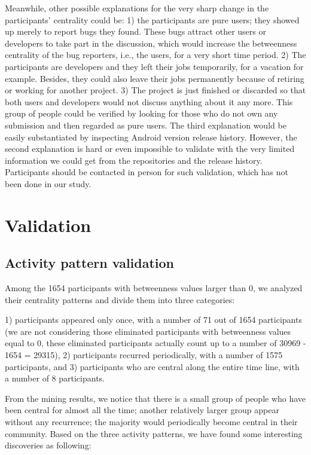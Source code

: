 \documentclass[10pt, conference, compsocconf]{IEEEtran}
\begin{document}
Meanwhile, other possible explanations for the very sharp change in
the participants' centrality could be: 1) the participants are pure
users; they showed up merely to report bugs they found. These bugs
attract other users or developers to take part in the discussion,
which would increase the betweenness centrality of the bug reporters,
i.e., the users, for a very short time period. 2) The participants are
developers and they left their jobs temporarily, for a vacation for
example. Besides, they could also leave their jobs permanently because
of retiring or working for another project. 3) The project is just
finished or discarded so that both users and developers would not
discuss anything about it any more. This group of people could be
verified by looking for those who do not own any submission and then
regarded as pure users. The third explanation would be easily
substantiated by inspecting Android version release history. However,
the second explanation is hard or even impossible to validate with the
very limited information we could get from the repositories and the
release history. Participants should be contacted in person for such
validation, which has not been done in our study.




\section{Validation}
\label{validation}
\subsection{Activity pattern validation}

Among the 1654 participants with betweenness values larger than 0, we
analyzed their centrality patterns and divide them into three
categories: 

1) participants appeared only once, with a number of 71 out of 1654
participants (we are not considering those eliminated participants
with betweenness values equal to 0, these eliminated participants
actually count up to a number of 30969 - 1654 = 29315), 
2) participants recurred periodically, with a number of 1575 participants,
and 3) participants who are central along the entire time line, with a
number of 8 participants.


From the mining results, we notice that there is a small group of
people who have been central for almost all the time; another
relatively larger group appear without any recurrence; the majority
would periodically become central in their community. Based on the
three activity patterns, we have found some interesting discoveries as
following:
\end{document}
